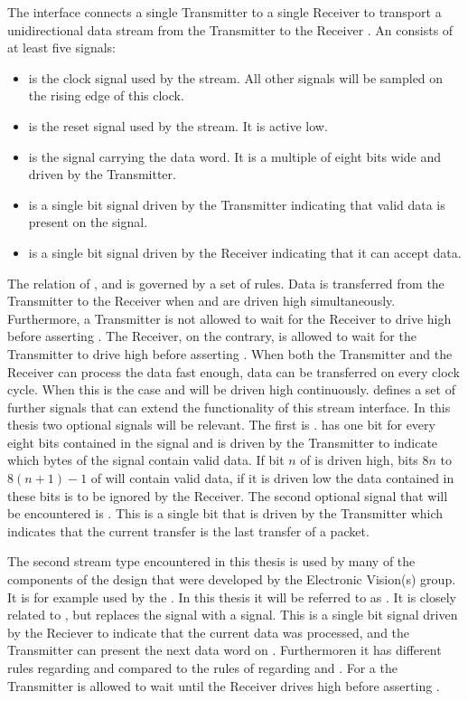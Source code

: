 The \AXIStream{} interface connects a single Transmitter to a single Receiver to transport a unidirectional data stream from the Transmitter to the Receiver . An \AXIStream{} consists of at least five signals:
\begin{itemize}
    \item \ACLK{} is the clock signal used by the stream. All other signals will be sampled on the rising edge of this clock.
    \item \ARESETn{} is the reset signal used by the stream. It is active low.
    \item \TDATA{} is the signal carrying the data word. It is a multiple of eight bits wide and driven by the Transmitter.
    \item \TVALID{} is a single bit signal driven by the Transmitter indicating that valid data is present on the \TDATA{} signal.
    \item \TREADY{} is a single bit signal driven by the Receiver indicating that it can accept data.
\end{itemize}
The relation of \TDATA{}, \TVALID{} and \TREADY{} is governed by a set of rules.
Data is transferred from the Transmitter to the Receiver when \TREADY{} and \TVALID{} are driven high simultaneously.
Furthermore, a Transmitter is not allowed to wait for the Receiver to drive \TREADY{} high before asserting \TVALID{}. The Receiver, on the contrary, is allowed to wait for the Transmitter to drive \TVALID{} high before asserting \TREADY{}.
When both the Transmitter and the Receiver can process the data fast enough, data can be transferred on every clock cycle. When this is the case \TREADY{} and \TVALID{} will be driven high continuously.
\AXIStream{} defines a set of further signals that can extend the functionality of this stream interface. In this thesis two optional signals will be relevant.
The first is \TKEEP{}. \TKEEP{} has one bit for every eight bits contained in the \TDATA{} signal and is driven by the Transmitter to indicate which bytes of the \TDATA{} signal contain valid data.
If bit $n$ of \TKEEP{} is driven high, bits $8n$ to $8(n + 1) - 1$ of \TDATA{} will contain valid data, if it is driven low the data contained in these bits is to be ignored by the Receiver.
The second optional signal that will be encountered is \TLAST{}. This is a single bit that is driven by the Transmitter which indicates that the current transfer is the last transfer of a packet.

The second stream type encountered in this thesis is used by many of the components of the \FPGA{} design that were developed by the Electronic Vision(s) group. It is for example used by the \pbexec{}. In this thesis it will be referred to as \ValidNextStream{}. It is closely related to \AXIStream{}, but replaces the \TREADY{} signal with a \NEXT{} signal.
This is a single bit signal driven by the Reciever to indicate that the current data was processed, and the Transmitter can present the next data word on \TDATA{}. Furthermoren it has different rules regarding \TVALID{} and \NEXT{} compared to the rules of regarding \TVALID{} and \TREADY{}.
For a \ValidNextStream{} the Transmitter is allowed to wait until the Receiver drives \NEXT{} high before asserting \TVALID{}.

